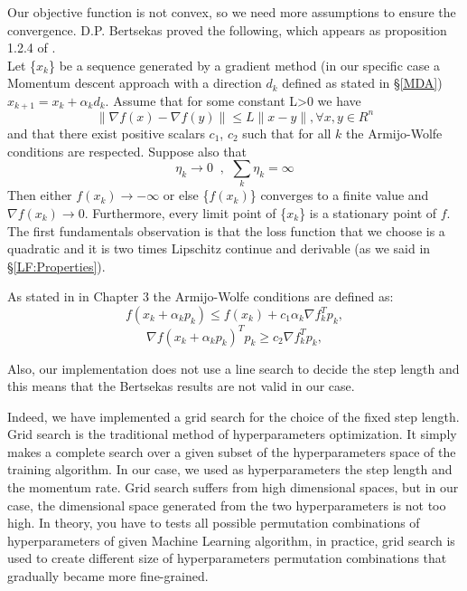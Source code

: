 Our objective function is not convex, so we need more assumptions to ensure the convergence.
D.P. Bertsekas proved the following, which appears as proposition 1.2.4 of \cite{bert03}.
\\ Let \{$x_k$\} be a sequence generated by a gradient method (in our specific case a Momentum descent approach with a direction $d_{k}$ defined as stated in \S \ref{MDA}) $x_{k+1}=x_k+\alpha_kd_k$. Assume that for some constant L>0 we have
\begin{equation}
\label{assumption:momentum_descent2}
\| \nabla f(x)-\nabla f(y)\|\leq L\|x-y\|, \forall x,y \in R^n
\end{equation}
and that there exist positive scalars $c_1$, $c_2$ such that for all $k$ the Armijo-Wolfe conditions are respected.
Suppose also that
\begin{equation}
\label{assumption:momentum_descent4}
\eta_k \to 0 \  \text{ , } \ \sum_k \eta_k = \infty
\end{equation}
Then either $f(x_k)\to - \infty$ or else \{$f(x_k)$\} converges to a finite value and $\nabla f(x_k) \to 0$. Furthermore, every limit point of \{$x_k$\} is a stationary point of $f$.
The first fundamentals observation is that the loss function that we choose is a quadratic and it is two times Lipschitz continue and derivable (as we said in \S \ref{LF:Properties}).

As stated in \cite{numerical} in Chapter 3 the Armijo-Wolfe conditions are defined as:
\begin{equation}
\label{armijo}
f(x_k + \alpha_kp_k ) \leq f (x_k ) + c_1 \alpha_k \nabla f_k^T p_k,
\end{equation}
\begin{equation}
\label{wolfe}
\nabla f(x_k + \alpha_{k} p_k )^T p_k \geq c_2 \nabla f_k^T p_k ,
\end{equation}

Also, our implementation does not use a line search to decide the step length and this means that the Bertsekas results are not valid in our case.

Indeed, we have implemented a grid search for the choice of the fixed step length. Grid search is the traditional method of hyperparameters optimization. It simply makes a complete search over a given subset of the hyperparameters space of the training algorithm. In our case, we used as hyperparameters the step length and the momentum rate. Grid search suffers from high dimensional spaces, but in our case, the dimensional space generated from the two hyperparameters is not too high. In theory, you have to tests all possible permutation combinations of hyperparameters of given Machine Learning algorithm, in practice, grid search is used to create different size of hyperparameters permutation combinations that gradually became more fine-grained. 

